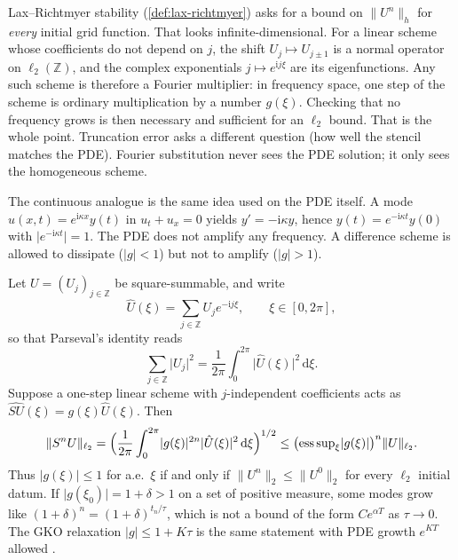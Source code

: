 \documentclass[11pt,a4paper]{article}
\begin{document}
Lax--Richtmyer stability (\cref{def:lax-richtmyer}) asks for a bound on \(\|U^n\|_h\) for \emph{every} initial grid function. That looks infinite-dimensional. For a linear scheme whose coefficients do not depend on \(j\), the shift \(U_j\mapsto U_{j\pm 1}\) is a normal operator on \(\ell_2(\mathbb Z)\), and the complex exponentials \(j\mapsto e^{\mathrm i j\xi}\) are its eigenfunctions. Any such scheme is therefore a Fourier multiplier: in frequency space, one step of the scheme is ordinary multiplication by a number \(g(\xi)\). Checking that no frequency grows is then necessary and sufficient for an \(\ell_2\) bound. That is the whole point. Truncation error asks a different question (how well the stencil matches the PDE). Fourier substitution never sees the PDE solution; it only sees the homogeneous scheme.

The continuous analogue is the same idea used on the PDE itself. A mode \(u(x,t)=e^{\mathrm i\kappa x}y(t)\) in \(u_t+u_x=0\) yields \(y'=-\mathrm i\kappa y\), hence \(y(t)=e^{-\mathrm i\kappa t}y(0)\) with \(\lvert e^{-\mathrm i\kappa t}\rvert=1\). The PDE does not amplify any frequency. A difference scheme is allowed to dissipate (\(|g|<1\)) but not to amplify (\(|g|>1\)).

\begin{proposition}
\label{prop:vn-plancherel}
Let \(U=(U_j)_{j\in\mathbb Z}\) be square-summable, and write
\[
\hat U(\xi)
=
\sum_{j\in\mathbb Z}U_j e^{-\mathrm i j\xi},
\qquad
\xi\in[0,2\pi],
\]
so that Parseval's identity reads
\[
\sum_{j\in\mathbb Z}\lvert U_j\rvert^2
=
\frac{1}{2\pi}\int_0^{2\pi}\lvert\hat U(\xi)\rvert^2\,\mathrm d\xi.
\]
Suppose a one-step linear scheme with \(j\)-independent coefficients acts as \(\widehat{SU}(\xi)=g(\xi)\hat U(\xi)\). Then
\[
\|S^n U\|_{\ell_2}
=
\Bigl(\frac{1}{2\pi}\int_0^{2\pi}\lvert g(\xi)\rvert^{2n}\lvert\hat U(\xi)\rvert^2\,\mathrm d\xi\Bigr)^{1/2}
\le
\bigl(\operatorname{ess\,sup}_{\xi}\lvert g(\xi)\rvert\bigr)^n
\|U\|_{\ell_2}.
\]
Thus \(\lvert g(\xi)\rvert\le 1\) for a.e.\ \(\xi\) if and only if \(\|U^n\|_2\le\|U^0\|_2\) for every \(\ell_2\) initial datum. If \(\lvert g(\xi_0)\rvert=1+\delta>1\) on a set of positive measure, some modes grow like \((1+\delta)^n=(1+\delta)^{t_n/\tau}\), which is not a bound of the form \(C e^{\alpha T}\) as \(\tau\to 0\). The GKO relaxation \(\lvert g\rvert\le 1+K\tau\) is the same statement with PDE growth \(e^{KT}\) allowed \cite{gko95,leveque07,strikwerda04}.
\end{proposition}
\end{document}

